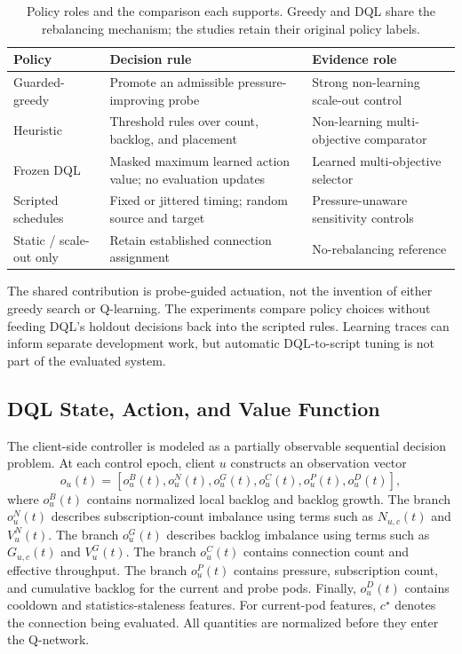 \begin{table}[!htbp]
\centering\small
\caption{Policy roles and the comparison each supports. Greedy and DQL share
the rebalancing mechanism; the studies retain their original policy labels.}
\label{tab:policy-roles}
\begin{tabular}{p{}p{}p{}}
\toprule
Policy & Decision rule & Evidence role\\
\midrule
Guarded-greedy & Promote an admissible pressure-improving probe & Strong non-learning scale-out control\\
Heuristic & Threshold rules over count, backlog, and placement & Non-learning multi-objective comparator\\
Frozen DQL & Masked maximum learned action value; no evaluation updates & Learned multi-objective selector\\
Scripted schedules & Fixed or jittered timing; random source and target & Pressure-unaware sensitivity controls\\
Static / scale-out only & Retain established connection assignment & No-rebalancing reference\\
\bottomrule
\end{tabular}
\end{table}

The shared contribution is probe-guided actuation, not the invention of either
greedy search or Q-learning. The experiments compare policy choices without
feeding DQL's holdout decisions back into the scripted rules. Learning traces
can inform separate development work, but automatic DQL-to-script tuning is
not part of the evaluated system.
\subsection{DQL State, Action, and Value Function}

The client-side controller is modeled as a partially observable sequential
decision problem. At each control epoch, client $u$ constructs an observation
vector
\begin{equation}
	o_u(t)=
	\left[
	o^B_u(t),o^N_u(t),o^G_u(t),o^C_u(t),o^P_u(t),o^D_u(t)
	\right],
	\label{eq:dql_observation}
\end{equation}
where $o^B_u(t)$ contains normalized local backlog and backlog growth.
The branch $o^N_u(t)$ describes subscription-count imbalance using terms such as
$N_{u,c}(t)$ and $V^N_u(t)$. The branch $o^G_u(t)$ describes backlog imbalance
using terms such as $G_{u,c}(t)$ and $V^G_u(t)$.
The branch $o^C_u(t)$ contains connection count and effective throughput.
The branch $o^P_u(t)$ contains pressure, subscription count, and cumulative
backlog for the current and probe pods. Finally, $o^D_u(t)$ contains cooldown
and statistics-staleness features. For current-pod features, $c^\star$ denotes
the connection being evaluated. All quantities are normalized before they
enter the Q-network.

